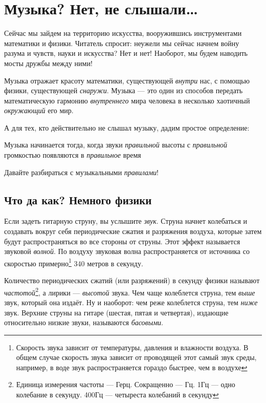 \chapter{Музыка? Нет, не слышали\ldots}
\label{ch:music}

Сейчас мы зайдем на территорию искусства, вооружившись инструментами математики и физики. Читатель спросит: неужели мы сейчас начнем войну разума и чувств, науки и искусства? Нет и нет! Наоборот, мы будем наводить мосты дружбы между ними! 

Музыка отражает красоту математики, существующей \emph{внутри} нас, с помощью физики, существующей \emph{снаружи}. Музыка --- это один из способов передать математическую гармонию \emph{внутреннего} мира человека в несколько хаотичный \emph{окружающий} его мир.

А для тех, кто действительно не слышал музыку, дадим простое определение:

\begin{Definition}[Музыка]
    Музыка начинается тогда, когда звуки \emph{правильной} высоты с \emph{правильной} громкостью появляются в \emph{правильное} время
\end{Definition}

Давайте разбираться с музыкальными \emph{правилами}!


\section{Что да как? Немного физики}
\label{ch:music:physics}

Если задеть гитарную струну, вы услышите \emph{звук}. Струна начнет колебаться и создавать вокруг себя периодические сжатия и разряжения воздуха, которые затем будут распространяться во все стороны от струны. Этот эффект называется звуковой \emph{волной}. По воздуху звуковая волна распространяется от источника со скоростью примерно\footnote{Скорость звука зависит от температуры, давления и влажности воздуха. В общем случае скорость звука зависит от проводящей этот самый звук среды, например, в воде звук распространяется гораздо быстрее, чем в воздухе} 340 метров в секунду.

Количество периодических сжатий (или разряжений) в секунду физики называют \emph{частотой}\footnote{Единица измерения частоты --- Герц. Сокращенно --- Гц. 1Гц --- одно колебание в секунду. 400Гц --- четыреста колебаний в секунду}, а лирики --- \emph{высотой} звука. Чем чаще колеблется струна, тем \emph{выше} звук, который она издаёт. Ну и наоборот: чем реже колеблется струна, тем \emph{ниже} звук. Верхние струны на гитаре (шестая, пятая и четвертая), издающие относительно низкие звуки, называются \emph{басовыми}.

